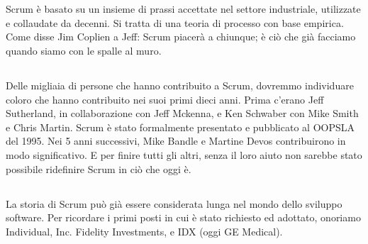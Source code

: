 \section*{\color{Blue}{RINGRAZIAMENTI}}
\label{sec:acknowledgements}

\subsection*{\color{Blue}{GENERALI}}
\label{sec:general}
Scrum \`e basato su un insieme di prassi accettate nel settore industriale, utilizzate e collaudate da decenni. Si tratta di una teoria di processo con base empirica. Come disse Jim Coplien a Jeff: \flqq Scrum piacer\`a a chiunque; \`e ci\`o che gi\`a facciamo quando siamo con le spalle al muro.\frqq

\subsection*{\color{Blue}{PERSONE}}
\label{sec:people}
Delle migliaia di persone che hanno contribuito a Scrum, dovremmo individuare coloro che hanno contribuito nei suoi primi dieci anni. Prima c'erano Jeff Sutherland, in collaborazione con Jeff Mckenna, e Ken Schwaber con Mike Smith e Chris Martin. Scrum \`e stato formalmente presentato e pubblicato al OOPSLA del 1995. Nei 5 anni successivi, Mike Bandle e Martine Devos contribuirono in modo significativo. E per finire tutti gli altri, senza il loro aiuto non sarebbe stato possibile ridefinire Scrum in ci\`o che oggi \`e.

\subsection*{\color{Blue}{STORIA}}
\label{sec:history}
La storia di Scrum pu\`o gi\`a essere considerata lunga nel mondo dello sviluppo software.
Per ricordare i primi posti in cui \`e stato richiesto ed adottato, onoriamo Individual, Inc. Fidelity Investments, e IDX (oggi GE Medical).

